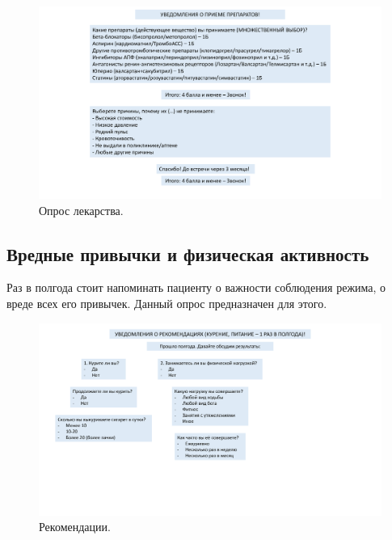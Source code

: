 \documentclass[a4paper,12pt]{article}
\begin{document}
    \begin{figure}[h]
        \includegraphics[scale=0.175]{images/presentation/1cbc101521d4d97c799189ce193d279d-1}
        \caption{Опрос лекарства.}\label{fig:figure2}
    \end{figure}

    \newpage

    \subsection{Вредные привычки и физическая активность}\label{subsec:----}

    Раз в полгода стоит напоминать пациенту о важности соблюдения режима, о вреде всех его привычек.
    Данный опрос предназначен для этого.

    \begin{figure}[h]
        \includegraphics[scale=0.175]{images/presentation/1cbc101521d4d97c799189ce193d279d-2}
        \caption{Рекомендации.}\label{fig:figure3}
    \end{figure}


    \newpage
\end{document}
